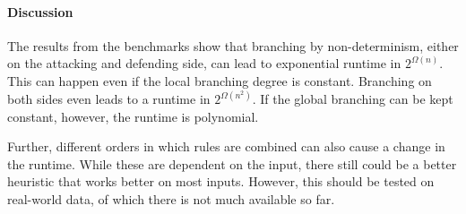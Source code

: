 \paragraph{Discussion}

The results from the benchmarks show that branching by non-determinism,
either on the attacking and defending side, can lead to exponential runtime
in $2^{\mathcal Ω(n)}$.
This can happen even if the local branching degree is constant.
Branching on both sides even leads to a runtime in $2^{\mathcal Ω(n^2)}$.
If the global branching can be kept constant, however, the runtime is
polynomial.

Further, different orders in which rules are combined can also cause
a change in the runtime. While these are dependent on the input,
there still could be a better heuristic that works better on most inputs.
However, this should be tested on real-world data, of which there is not
much available so far.

